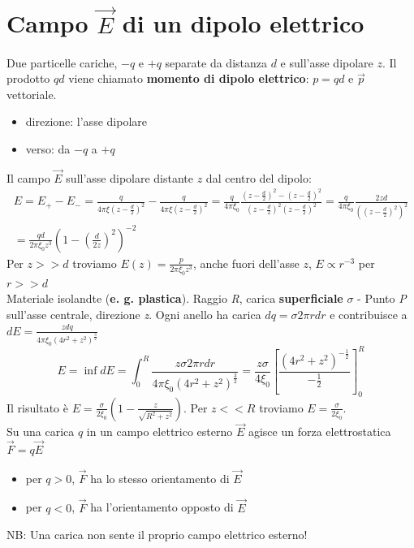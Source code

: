 \documentclass{book}
\begin{document}
\section{Campo $\vec{E}$ di un dipolo elettrico}
Due particelle cariche, $-q$ e $+q$ separate da distanza $d$ e sull'asse dipolare $z$. Il prodotto $qd$ viene chiamato \textbf{momento di dipolo elettrico}: $p=qd$ e $\vec{p}$ vettoriale.
\begin{itemize}
\item direzione: l'asse dipolare
\item verso: da $-q$ a $+q$
\end{itemize}
Il campo $\vec{E}$ sull'asse dipolare distante $z$ dal centro del dipolo:
\begin{equation}
  \begin{matrix}
    E=E_+-E_-=\frac{q}{4\pi \xi\left(z-\frac{d}{2}\right)^2}-\frac{q}{4\pi \xi\left(z-\frac{d}{2}\right)^2}
    =\frac{q}{4\pi\xi_0}\frac{\left(z-\frac{d}{2}\right)^2-\left(z-\frac{d}{2}\right)^2}{\left(z-\frac{d}{2}\right)^2\left(z-\frac{d}{2}\right)^2}
    =\frac{q}{4\pi\xi_0}\frac{2zd}{\left(\left(z-\frac{d}{2}\right)^2\right)^{2}}\\
    =\frac{qd}{2\pi\xi_0z^3}\left(1-\left(\frac{d}{2z}\right)^2\right)^{-2}
    \end{matrix}
\end{equation}
Per $z>>d$ troviamo $E(z)=\frac{p}{2\pi\xi_0z^3}$, anche fuori dell'asse $z$, $E\propto r^{-3}$ per $r>>d$\\
Materiale isolandte (\textbf{e. g. plastica}). Raggio \textit{R}, carica \textbf{superficiale} $\sigma$ - Punto \textit{P} sull'asse centrale, direzione \textit{z}. Ogni anello ha carica $dq=\sigma 2\pi rdr$ e contribuisce a $dE=\frac{zdq}{4\pi\xi_0\left(4r^2+z^2\right)^{\frac{3}{2}}}$
\begin{equation}
  E=\inf dE=\int^R_0\frac{z\sigma2\pi rdr}{4\pi\xi_0\left(4r^2+z^2\right)^{\frac{3}{2}}}=\frac{z\sigma}{4\xi_0}\left[\frac{\left(4r^2+z^2\right)^{-\frac{1}{2}}}{-\frac{1}{2}}\right]^R_0
\end{equation}
Il risultato è $E=\frac{\sigma}{2\xi_0}\left(1-\frac{z}{\sqrt{R^2+z^2}}\right)$. Per $z<<R$ troviamo $E=\frac{\sigma}{2\xi_0}$.\\
Su una carica $q$ in un campo elettrico esterno $\vec{E}$ agisce un forza elettrostatica $\vec{F}=q\vec{E}$
\begin{itemize}
  \item per $q>0$, $\vec F$ ha lo stesso orientamento di $\vec E$
  \item per $q<0$, $\vec F$ ha l'orientamento opposto di $\vec E$
\end{itemize}
NB: Una carica non sente il proprio campo elettrico esterno!
\end{document}
